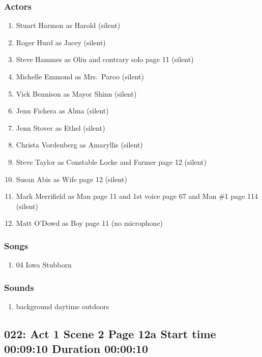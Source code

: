 \subsubsection{Actors}
\begin{enumerate}
\item Stuart Harmon as Harold (silent)
\item Roger Hurd as Jacey (silent)
\item Steve Hammes as Olin and contrary solo page 11 (silent)
\item Michelle Emmond as Mrs.~Paroo (silent)
\item Vick Bennison as Mayor Shinn (silent)
\item Jenn Fichera as Alma (silent)
\item Jenn Stover as Ethel (silent)
\item Christa Vordenberg as Amaryllis (silent)
\item Steve Taylor as Constable Locke and Farmer page 12 (silent)
\item Susan Abis as Wife page 12 (silent)
\item Mark Merrifield as Man page 11 and 1st voice page 67 and Man \#1 page 114 (silent)
\item Matt O'Dowd as Boy page 11 (no microphone)
\end{enumerate}

\subsubsection{Songs}
\begin{enumerate}
\item 04 Iowa Stubborn
\end{enumerate}\subsubsection{Sounds}
\begin{enumerate}
\item background daytime outdoors
\end{enumerate}
\subsection{022: Act 1 Scene 2 Page 12a Start time 00:09:10 Duration 00:00:10}


